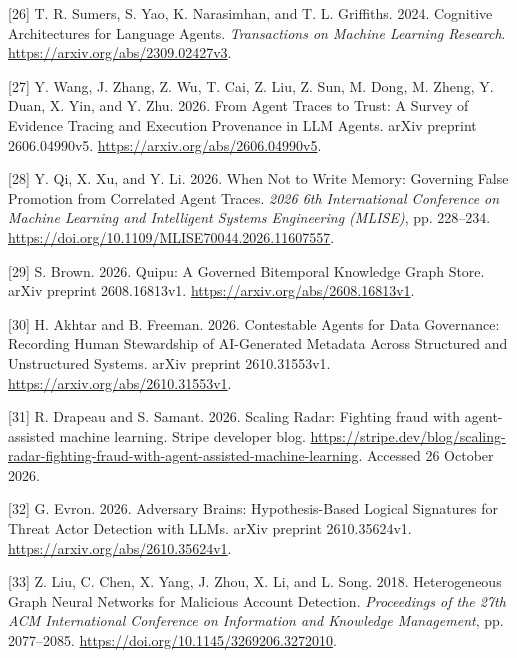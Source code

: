 \documentclass[
  11pt,
]{article}
\newlength{\cslhangindent}
\newlength{\cslentryspacingunit} %
\newenvironment{CSLReferences}[2] %
 {%
  \setlength{\parindent}{0pt}
  \ifodd #1
  \let\oldpar\par
  \def\par{\hangindent=\cslhangindent\oldpar}
  \fi
  \setlength{\parskip}{#2\cslentryspacingunit}
 }%
 {}
\begin{document}
\begin{CSLReferences}{1}{1}
\leavevmode{}%
{[}26{]} T. R. Sumers, S. Yao, K. Narasimhan, and T. L. Griffiths. 2024.
Cognitive Architectures for Language Agents. \emph{Transactions on
Machine Learning Research}. \url{https://arxiv.org/abs/2309.02427v3}.

\leavevmode{}%
{[}27{]} Y. Wang, J. Zhang, Z. Wu, T. Cai, Z. Liu, Z. Sun, M. Dong, M.
Zheng, Y. Duan, X. Yin, and Y. Zhu. 2026. From Agent Traces to Trust: A
Survey of Evidence Tracing and Execution Provenance in LLM Agents. arXiv
preprint 2606.04990v5. \url{https://arxiv.org/abs/2606.04990v5}.

\leavevmode{}%
{[}28{]} Y. Qi, X. Xu, and Y. Li. 2026. When Not to Write Memory:
Governing False Promotion from Correlated Agent Traces. \emph{2026 6th
International Conference on Machine Learning and Intelligent Systems
Engineering (MLISE)}, pp. 228--234.
\url{https://doi.org/10.1109/MLISE70044.2026.11607557}.

\leavevmode{}%
{[}29{]} S. Brown. 2026. Quipu: A Governed Bitemporal Knowledge Graph
Store. arXiv preprint 2608.16813v1.
\url{https://arxiv.org/abs/2608.16813v1}.

\leavevmode{}%
{[}30{]} H. Akhtar and B. Freeman. 2026. Contestable Agents for Data
Governance: Recording Human Stewardship of AI-Generated Metadata Across
Structured and Unstructured Systems. arXiv preprint 2610.31553v1.
\url{https://arxiv.org/abs/2610.31553v1}.

\leavevmode{}%
{[}31{]} R. Drapeau and S. Samant. 2026. Scaling Radar: Fighting fraud
with agent-assisted machine learning. Stripe developer blog.
\url{https://stripe.dev/blog/scaling-radar-fighting-fraud-with-agent-assisted-machine-learning}.
Accessed 26 October 2026.

\leavevmode{}%
{[}32{]} G. Evron. 2026. Adversary Brains: Hypothesis-Based Logical
Signatures for Threat Actor Detection with LLMs. arXiv preprint
2610.35624v1. \url{https://arxiv.org/abs/2610.35624v1}.

\leavevmode{}%
{[}33{]} Z. Liu, C. Chen, X. Yang, J. Zhou, X. Li, and L. Song. 2018.
Heterogeneous Graph Neural Networks for Malicious Account Detection.
\emph{Proceedings of the 27th ACM International Conference on
Information and Knowledge Management}, pp. 2077--2085.
\url{https://doi.org/10.1145/3269206.3272010}.


\end{CSLReferences}
\end{document}
